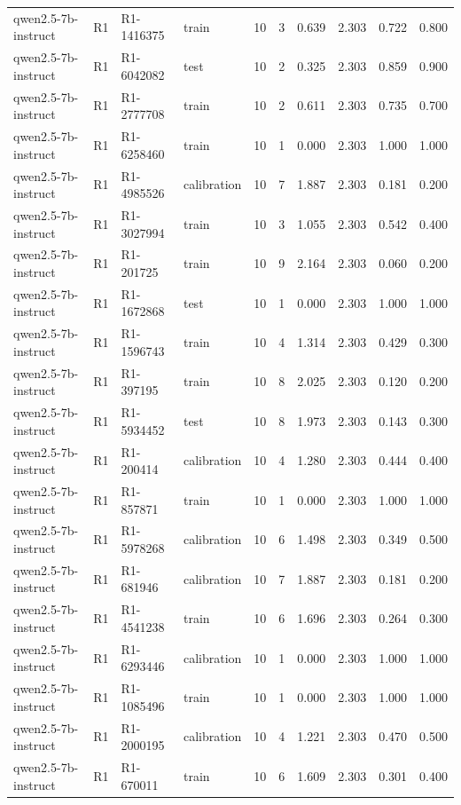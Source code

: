 \begin{table}
\begin{tabular}{llllrrrrrr}
qwen2.5-7b-instruct & R1 & R1-1416375 & train & 10 & 3 & 0.639 & 2.303 & 0.722 & 0.800 \\
qwen2.5-7b-instruct & R1 & R1-6042082 & test & 10 & 2 & 0.325 & 2.303 & 0.859 & 0.900 \\
qwen2.5-7b-instruct & R1 & R1-2777708 & train & 10 & 2 & 0.611 & 2.303 & 0.735 & 0.700 \\
qwen2.5-7b-instruct & R1 & R1-6258460 & train & 10 & 1 & 0.000 & 2.303 & 1.000 & 1.000 \\
qwen2.5-7b-instruct & R1 & R1-4985526 & calibration & 10 & 7 & 1.887 & 2.303 & 0.181 & 0.200 \\
qwen2.5-7b-instruct & R1 & R1-3027994 & train & 10 & 3 & 1.055 & 2.303 & 0.542 & 0.400 \\
qwen2.5-7b-instruct & R1 & R1-201725 & train & 10 & 9 & 2.164 & 2.303 & 0.060 & 0.200 \\
qwen2.5-7b-instruct & R1 & R1-1672868 & test & 10 & 1 & 0.000 & 2.303 & 1.000 & 1.000 \\
qwen2.5-7b-instruct & R1 & R1-1596743 & train & 10 & 4 & 1.314 & 2.303 & 0.429 & 0.300 \\
qwen2.5-7b-instruct & R1 & R1-397195 & train & 10 & 8 & 2.025 & 2.303 & 0.120 & 0.200 \\
qwen2.5-7b-instruct & R1 & R1-5934452 & test & 10 & 8 & 1.973 & 2.303 & 0.143 & 0.300 \\
qwen2.5-7b-instruct & R1 & R1-200414 & calibration & 10 & 4 & 1.280 & 2.303 & 0.444 & 0.400 \\
qwen2.5-7b-instruct & R1 & R1-857871 & train & 10 & 1 & 0.000 & 2.303 & 1.000 & 1.000 \\
qwen2.5-7b-instruct & R1 & R1-5978268 & calibration & 10 & 6 & 1.498 & 2.303 & 0.349 & 0.500 \\
qwen2.5-7b-instruct & R1 & R1-681946 & calibration & 10 & 7 & 1.887 & 2.303 & 0.181 & 0.200 \\
qwen2.5-7b-instruct & R1 & R1-4541238 & train & 10 & 6 & 1.696 & 2.303 & 0.264 & 0.300 \\
qwen2.5-7b-instruct & R1 & R1-6293446 & calibration & 10 & 1 & 0.000 & 2.303 & 1.000 & 1.000 \\
qwen2.5-7b-instruct & R1 & R1-1085496 & train & 10 & 1 & 0.000 & 2.303 & 1.000 & 1.000 \\
qwen2.5-7b-instruct & R1 & R1-2000195 & calibration & 10 & 4 & 1.221 & 2.303 & 0.470 & 0.500 \\
qwen2.5-7b-instruct & R1 & R1-670011 & train & 10 & 6 & 1.609 & 2.303 & 0.301 & 0.400 \\

\end{tabular}
\end{table}
